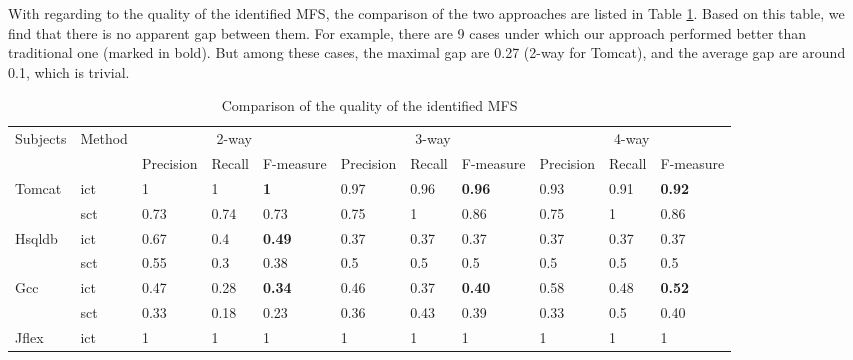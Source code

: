 \documentclass{sig-alternate}
\begin{document}

With regarding to the quality of the identified MFS, the comparison of the two approaches are listed in Table \ref{cm_elda_fglt}. Based on this table, we find that there is no apparent gap between them. For example, there are 9 cases under which our approach performed better than traditional one (marked in bold). But among these cases, the maximal gap are  0.27 (2-way for Tomcat), and the average gap are around 0.1, which is trivial.

\begin{table}[htbp]
\center
\caption{Comparison of the quality of the identified MFS}
\label{cm_elda_fglt}
\begin{tabular}{|ll|lll|lll|lll|}
\hline
\multirow{2}{*}{Subjects} & \multirow{2}{*}{Method} & \multicolumn{3}{c|}{2-way} & \multicolumn{3}{c|}{3-way} & \multicolumn{3}{c|}{4-way} \\ \cline{3-11}
                         &                        & Precision & Recall & F-measure   & Precision & Recall & F-measure & Precision & Recall & F-measure   \\ \hline
Tomcat                   & ict                    & 1    & 1    & \textbf{1}     &0.97    & 0.96   & \textbf{0.96}     &  0.93    &  0.91   &  \textbf{0.92 }       \\
                         & sct                   & 0.73    & 0.74    & 0.73      & 0.75     & 1    & 0.86        & 0.75     & 1    & 0.86         \\ \hline
Hsqldb                   & ict                    & 0.67    & 0.4    & \textbf{0.49}      & 0.37    & 0.37   & 0.37       & 0.37    & 0.37   & 0.37        \\
                         & sct                    & 0.55    & 0.3    & 0.38       & 0.5     & 0.5    & 0.5      & 0.5     & 0.5    & 0.5         \\ \hline
Gcc                      & ict                     & 0.47    & 0.28   & \textbf{0.34 }      & 0.46    & 0.37   &\textbf{ 0.40}        & 0.58    & 0.48  &\textbf{ 0.52 }       \\
                         & sct                      & 0.33    & 0.18   & 0.23        & 0.36    & 0.43   & 0.39       & 0.33     & 0.5    & 0.40      \\ \hline
Jflex                    & ict                     & 1       & 1      & 1           & 1       & 1      & 1          & 1       & 1      & 1           \\

\end{tabular}
\end{table}
\end{document}
